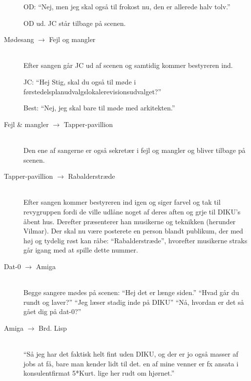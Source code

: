 \documentclass[a4paper,11pt]{article}
\begin{document}
\begin{description}
OD: ``Nej, men jeg skal også til frokost nu, den er allerede halv tolv.''

OD ud. JC står tilbage på scenen.

\item[Mødesang $\rightarrow$ Fejl og mangler]\hfill\\
Efter sangen går JC ud af scenen og samtidig kommer bestyreren ind.

JC: ``Hej Stig, skal du også til møde i
førstedelsplanudvalgslokalerevisionsudvalget?''

Best: ``Nej, jeg skal bare til møde med arkitekten.''

\item[Fejl \& mangler $\rightarrow$ Tapper-pavillion]\hfill\\
Den ene af sangerne er også sekretær i fejl og mangler og bliver tilbage på
scenen.

\item[Tapper-pavillion $\rightarrow$ Rabalderstræde]\hfill\\
Efter sangen kommer bestyreren ind igen og siger farvel og tak til revygruppen
fordi de ville udlåne noget af deres aften og grje til DIKU's åbent
hus. Derefter præsenterer han musikerne og teknikken (herunder Vilmar). Der skal
nu være posterete en person blandt publikum, der med høj og tydelig røst kan
råbe: ``Rabalderstræde'', hvorefter musikerne straks går igang med at spille
dette nummer.

\item[Dat-0 $\rightarrow$ Amiga]\hfill\\
Begge sangere mødes på scenen: ``Hej det er længe siden.'' ``Hvad går du rundt
og laver?'' ``Jeg læser stadig inde på DIKU'' ``Nå, hvordan er det så gået dig
på dat-0?''

\item[Amiga $\rightarrow$ Brd. Lisp]\hfill\\
``Så jeg har det faktisk helt fint uden DIKU, og der er jo også masser af jobs
at få, bare man kender lidt til det. en af mine venner er fx ansata i
konsulentfirmat 5*Kurt. lige her rudt om hjørnet.''
\end{description}
\end{document}
